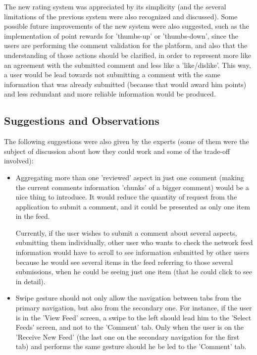 The new rating system was appreciated by its simplicity (and the several limitations of the previous system were also recognized and discussed). Some possible future improvements of the new system were also suggested, such as the implementation of point rewards for 'thumbs-up' or 'thumbs-down', since the users are performing the comment validation for the platform, and also that the understanding of those actions should be clarified, in order to represent more like an agreement with the submitted comment and less like a 'like/dislike'. This way, a user would be lead towards not submitting a comment with the same information that was already submitted (because that would award him points) and less redundant and more reliable information would be produced.

\subsection{Suggestions and Observations}

The following suggestions were also given by the experts (some of them were the subject of discussion about how they could work and some of the trade-off involved):

\begin{itemize}
\item Aggregating more than one 'reviewed' aspect in just one comment (making the current comments information 'chunks' of a bigger comment) would be a nice thing to introduce. It would reduce the quantity of request from the application to submit a comment, and it could be presented as only one item in the feed. 

Currently, if the user wishes to submit a comment about several aspects, submitting them individually, other user who wants to check the network feed information would have to scroll to see information submitted by other users because he would see several items in the feed referring to those several submissions, when he could be seeing just one item (that he could click to see in detail).

\item Swipe gesture should not only allow the navigation between tabs from the primary navigation, but also from the secondary one. For instance, if the user is in the 'View Feed' screen, a swipe to the left should lead him to the 'Select Feeds' screen, and not to the 'Comment' tab. Only when the user is on the 'Receive New Feed' (the last one on the secondary navigation for the first tab) and performs the same gesture should he be led to the 'Comment' tab.
\end{itemize}

